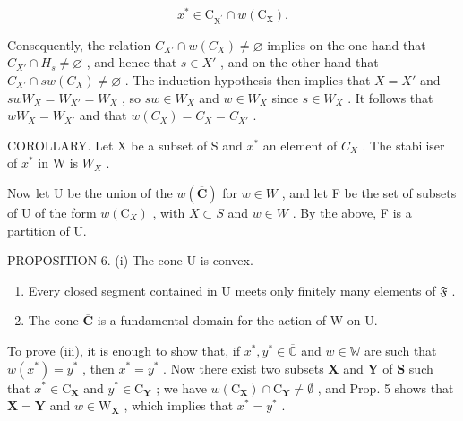 \[
x ^ {*} \in \mathrm{C} _ {\mathrm{X} ^ {\prime}} \cap w (\mathrm{C} _ {\mathrm{X}}).
\]

Consequently, the relation \(C_{X'} \cap w(C_X) \neq \varnothing\) implies on the one hand that \(C_{X'} \cap H_s \neq \varnothing\) , and hence that \(s \in X'\) , and on the other hand that \(C_{X'} \cap sw(C_X) \neq \varnothing\) . The induction hypothesis then implies that \(X = X'\) and \(swW_X = W_{X'} = W_X\) , so \(sw \in W_X\) and \(w \in W_X\) since \(s \in W_X\) . It follows that \(wW_X = W_{X'}\) and that \(w(C_X) = C_X = C_{X'}\) .

COROLLARY. Let X be a subset of S and \(x^{*}\) an element of \(C_{X}\) . The stabiliser of \(x^{*}\) in W is \(W_{X}\) .

Now let U be the union of the \(w(\overline{\mathbf{C}})\) for \(w \in W\) , and let F be the set of subsets of U of the form \(w(\mathrm{C}_{X})\) , with \(X \subset S\) and \(w \in W\) . By the above, F is a partition of U.

PROPOSITION 6. (i) The cone U is convex.

\begin{enumerate}
\def\labelenumi{(\roman{enumi})}
\setcounter{enumi}{1}
\item
  Every closed segment contained in U meets only finitely many elements of \(\mathfrak{F}\) .
\item
  The cone \(\overline{\mathbf{C}}\) is a fundamental domain for the action of W on U.
\end{enumerate}

To prove (iii), it is enough to show that, if \(x^{*}, y^{*} \in \overline{\mathbb{C}}\) and \(w \in \mathbb{W}\) are such that \(w(x^{*}) = y^{*}\) , then \(x^{*} = y^{*}\) . Now there exist two subsets \(\mathbf{X}\) and \(\mathbf{Y}\) of \(\mathbf{S}\) such that \(x^{*} \in \mathrm{C}_{\mathbf{X}}\) and \(y^{*} \in \mathrm{C}_{\mathbf{Y}}\) ; we have \(w(\mathrm{C}_{\mathbf{X}}) \cap \mathrm{C}_{\mathbf{Y}} \neq \emptyset\) , and Prop. 5 shows that \(\mathbf{X} = \mathbf{Y}\) and \(w \in \mathrm{W}_{\mathbf{X}}\) , which implies that \(x^{*} = y^{*}\) .

